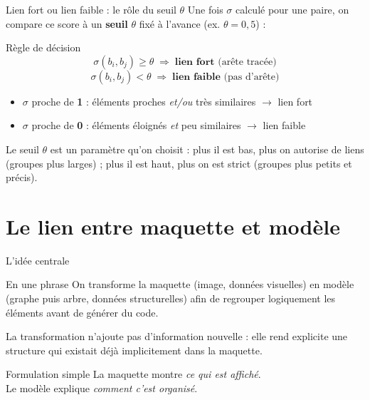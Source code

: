 \documentclass[11pt,aspectratio=169]{beamer}
\begin{document}
\begin{frame}{Lien fort ou lien faible : le rôle du seuil $\theta$}
Une fois $\sigma$ calculé pour une paire, on compare ce score à un \textbf{seuil} $\theta$ fixé à l'avance (ex. $\theta = 0{,}5$) :

\vspace{0.3cm}
\begin{block}{Règle de décision}
\[
\sigma(b_i,b_j) \geq \theta \;\Rightarrow\; \textbf{lien fort} \text{ (arête tracée)}
\]
\[
\sigma(b_i,b_j) < \theta \;\Rightarrow\; \textbf{lien faible} \text{ (pas d'arête)}
\]
\end{block}

\vspace{0.3cm}
\begin{itemize}
    \item $\sigma$ proche de \textbf{1} : éléments proches \emph{et/ou} très similaires $\to$ lien fort
    \item $\sigma$ proche de \textbf{0} : éléments éloignés \emph{et} peu similaires $\to$ lien faible
\end{itemize}

\vspace{0.3cm}
\small
Le seuil $\theta$ est un paramètre qu'on choisit : plus il est bas, plus on autorise de liens (groupes plus larges) ; plus il est haut, plus on est strict (groupes plus petits et précis).
\end{frame}



\section{Le lien entre maquette et modèle}

\begin{frame}{L'idée centrale}
\begin{block}{En une phrase}
On transforme la maquette (image, données visuelles) en modèle (graphe puis arbre, données structurelles) afin de regrouper logiquement les éléments avant de générer du code.
\end{block}

\vspace{0.3cm}
La transformation n'ajoute pas d'information nouvelle : elle rend explicite une structure qui existait déjà implicitement dans la maquette.

\vspace{0.3cm}
\begin{block}{Formulation simple}
La maquette montre \emph{ce qui est affiché}.\\
Le modèle explique \emph{comment c'est organisé}.
\end{block}
\end{frame}
\end{document}
